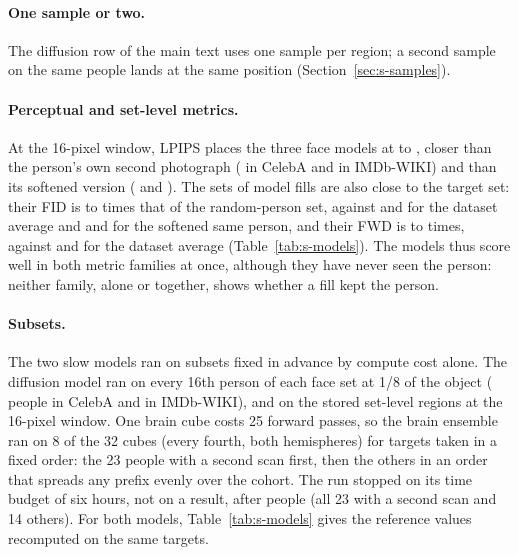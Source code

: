 \paragraph{One sample or two.}
The diffusion row of the main text uses one sample per region; a second sample on the same people lands at the same position (Section~\ref{sec:s-samples}).

\paragraph{Perceptual and set-level metrics.}
At the 16-pixel window, \ac{LPIPS} places the three face models at \mfFaceLpipsMin{} to \mfFaceLpipsMax{}, closer than the person's own second photograph (\mfLamaHqCelebaRefRepeatLpips{} in CelebA and \mfLamaHqImdbRefRepeatLpips{} in IMDb-WIKI) and than its softened version (\mfLamaHqCelebaRefSoftLpips{} and \mfLamaHqImdbRefSoftLpips{}).
The sets of model fills are also close to the target set: their \ac{FID} is \mfFaceFidMin{} to \mfFaceFidMax{} times that of the random-person set, against \mfRefCelebaMeanFid{} and \mfRefImdbMeanFid{} for the dataset average and \mfRefCelebaSoftFid{} and \mfRefImdbSoftFid{} for the softened same person, and their \ac{FWD} is \mfFaceFwdMin{} to \mfFaceFwdMax{} times, against \mfRefCelebaMeanFwd{} and \mfRefImdbMeanFwd{} for the dataset average (Table~\ref{tab:s-models}).
The models thus score well in both metric families at once, although they have never seen the person: neither family, alone or together, shows whether a fill kept the person.

\paragraph{Subsets.}
The two slow models ran on subsets fixed in advance by compute cost alone.
The diffusion model ran on every 16th person of each face set at 1/8 of the object (\mfSdCelebaN{} people in CelebA and \mfSdImdbN{} in IMDb-WIKI), and on the stored set-level regions at the 16-pixel window.
One brain cube costs 25 forward passes, so the brain ensemble ran on 8 of the 32 cubes (every fourth, both hemispheres) for targets taken in a fixed order: the 23 people with a second scan first, then the others in an order that spreads any prefix evenly over the cohort.
The run stopped on its time budget of six hours, not on a result, after \mfBratsQtimN{} people (all 23 with a second scan and 14 others).
For both models, Table~\ref{tab:s-models} gives the reference values recomputed on the same targets.

